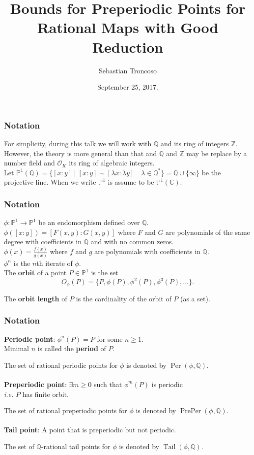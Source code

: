 \documentclass{beamer}
\title[Bounds for Preperiodic Points]{Bounds for Preperiodic Points for Rational Maps with Good Reduction}
\author[S. Troncoso]{Sebastian Troncoso}
\institute[BSC]{Birmingham-Southern College}
\date[September 25, 2017.]{ September 25, 2017. \\ \vspace{1cm} }
\def\jump{ \quad \\ \vspace{0.7cm} \pause}
\def\CC{{\mathbb C}}
\def\PP{{\mathbb P}}
\def\QQ{{\mathbb Q}}
\DeclareMathOperator{\Tail}{Tail}
\DeclareMathOperator{\Per}{Per}
\DeclareMathOperator{\PrePer}{PrePer}
\theoremstyle{thmstyle}
\theoremstyle{thmstyle}
\theoremstyle{mystyle}
\theoremstyle{qstnstyle}
\begin{document}
\begin{frame}
\titlepage
\end{frame}

\begin{frame}
\frametitle{Notation}
For simplicity, during this talk we will work with $\mathbb{Q}$ and its ring of integers $\mathbb{Z}$.
\jump
However, the theory is more general than that and $\mathbb{Q}$ and $\mathbb{Z}$ may be replace by a number field and $\mathcal{O}_K$ its ring of algebraic integers.
\jump
Let $\displaystyle \mathbb{P}^1(\QQ)=\{[x:y] \mid  [x:y]\sim [\lambda x:\lambda y] \quad \lambda\in \QQ^{*} \} = \QQ\cup \{\infty \}$ be  the projective line. \pause When we write $\PP^1$ is assume to be $\PP^1(\CC)$.

\end{frame}

\begin{frame}
\frametitle{Notation}
$\phi:\mathbb{P}^1\to\mathbb{P}^1$ be an endomorphism defined over $\QQ$.
\jump
$\phi([x:y])=[F(x,y):G(x,y)]$ where $F$ and $G$ are polynomials of the same degree with coefficients in $\QQ$ and with no common zeros.
\jump
$\displaystyle\phi(x)=\frac{f(x)}{g(x)}$ where $f$ and $g$ are polynomials with coefficients in $\QQ$.
\jump
$\phi^n$ is the $n$th iterate of $\phi$.
\\ \pause
The \textbf{orbit} of a point $P\in\PP^1$ is the set 
$$ O_{\phi}(P) = \{P, \phi(P),\phi^2(P),\phi^3(P),\ldots \}.$$

\pause The \textbf{orbit length} of $P$ is the cardinality of the orbit of $P$ (as a set).
\end{frame}

\begin{frame}
\frametitle{Notation}

\textbf{Periodic point}: $\phi^n(P)=P$ for some $n\geq{1}$.
\\\quad\quad \pause Minimal $n$ is called the \textbf{period} of $P$.

\pause
\vspace{2mm}
The set of rational periodic points for $\phi$ is denoted by $\Per(\phi,\QQ)$.
\\\quad\\
\pause
\textbf{Preperiodic point}: $\exists m\geq{0}$ such that $\phi^m(P)$
is periodic \\\quad\quad \pause \emph{i.e.}  $P$ has finite orbit.

\pause
\vspace{2mm}
The set of rational preperiodic points for $\phi$ is denoted by $\PrePer(\phi,\QQ)$.
\\\quad\\
\pause
\textbf{Tail point}: A point that is preperiodic but not periodic.

\pause
\vspace{2mm}
The set of $\QQ$-rational tail points for $\phi$ is denoted by $\Tail(\phi,\QQ)$.
\end{frame}
\end{document}

